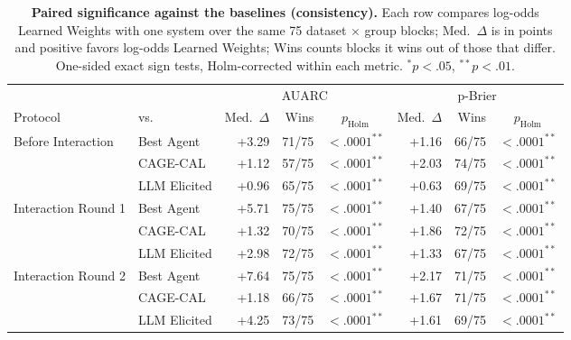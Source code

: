 \begin{table}[t]
\centering
\small
\setlength{\tabcolsep}{3.5pt}
\begin{tabular}{ll rrc rrc}
\toprule
 & & \multicolumn{3}{c}{AUARC} & \multicolumn{3}{c}{p-Brier} \\
\cmidrule(lr){3-5} \cmidrule(lr){6-8}
Protocol & vs. & Med.\ $\Delta$ & Wins & $p_{\mathrm{Holm}}$ & Med.\ $\Delta$ & Wins & $p_{\mathrm{Holm}}$ \\
\midrule
Before Interaction & Best Agent & +3.29 & 71/75 & $<.0001^{**}$ & +1.16 & 66/75 & $<.0001^{**}$ \\
 & CAGE-CAL & +1.12 & 57/75 & $<.0001^{**}$ & +2.03 & 74/75 & $<.0001^{**}$ \\
 & LLM Elicited & +0.96 & 65/75 & $<.0001^{**}$ & +0.63 & 69/75 & $<.0001^{**}$ \\
\midrule
Interaction Round 1 & Best Agent & +5.71 & 75/75 & $<.0001^{**}$ & +1.40 & 67/75 & $<.0001^{**}$ \\
 & CAGE-CAL & +1.32 & 70/75 & $<.0001^{**}$ & +1.86 & 72/75 & $<.0001^{**}$ \\
 & LLM Elicited & +2.98 & 72/75 & $<.0001^{**}$ & +1.33 & 67/75 & $<.0001^{**}$ \\
\midrule
Interaction Round 2 & Best Agent & +7.64 & 75/75 & $<.0001^{**}$ & +2.17 & 71/75 & $<.0001^{**}$ \\
 & CAGE-CAL & +1.18 & 66/75 & $<.0001^{**}$ & +1.67 & 71/75 & $<.0001^{**}$ \\
 & LLM Elicited & +4.25 & 73/75 & $<.0001^{**}$ & +1.61 & 69/75 & $<.0001^{**}$ \\
\bottomrule
\end{tabular}
\caption{\textbf{Paired significance against the baselines (consistency).} Each row compares log-odds Learned Weights with one system over the same 75 dataset $\times$ group blocks; Med.\ $\Delta$ is in points and positive favors log-odds Learned Weights; Wins counts blocks it wins out of those that differ. One-sided exact sign tests, Holm-corrected within each metric. $^{*}p<.05$, $^{**}p<.01$.}
\label{tab:significance}
\end{table}
